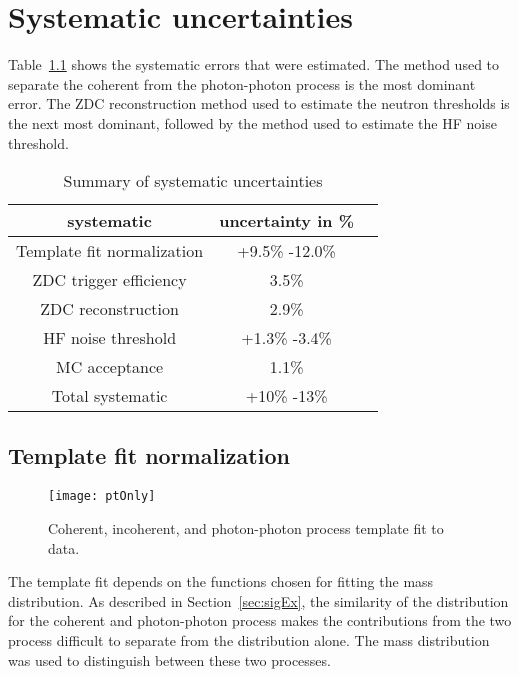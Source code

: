 \chapter{\label{sec:sysCheck}Systematic uncertainties}
  
  Table~\ref{tab:sumsyst} shows the systematic errors that were estimated.
  The method used to separate the coherent from the photon-photon process 
   is the most dominant error.
  The ZDC reconstruction method used to estimate the neutron thresholds 
    is the next most dominant, followed by the method used to estimate
    the HF noise threshold. 
  \begin{table}[!Hhtb]
    \begin{center}
      \begin{tabular}{|c|c|c|}
        \hline
        systematic & uncertainty in \%  \\ \hline
        Template fit normalization & +9.5\% -12.0\%    \\ \hline
        ZDC trigger efficiency & 3.5\%    \\ \hline
        ZDC reconstruction  & 2.9\%  \\ \hline
        HF noise threshold & +1.3\% -3.4\%    \\ \hline 
        MC acceptance & 1.1\%    \\ \hline
        \hline \hline
        Total systematic & +10\% -13\%   \\ \hline
      \end{tabular}
      \caption{Summary of systematic uncertainties}
      \label{tab:sumsyst}
    \end{center}
  \end{table}

  \section{Template fit normalization}
    \begin{figure}[!Hhtb]
      \centering
      \texttt{[image: ptOnly]}
      \caption{Coherent, incoherent, and photon-photon process \pt{} template fit to data.}
      \label{fig:ptTempFit}
    \end{figure}
   
    The \pt{} template fit depends on the functions chosen for fitting
      the mass distribution.
    As described in Section~\ref{sec:sigEx}, the similarity of the 
      \pt{} distribution for the coherent and photon-photon process makes
      the contributions from the two process difficult to separate from the 
      \pt{} distribution alone.
    The mass distribution was used to distinguish between these two processes.

